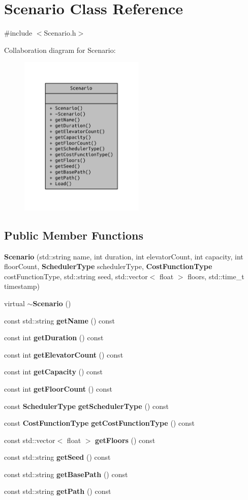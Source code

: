 \section{Scenario Class Reference}
\label{class_scenario}


{\ttfamily \#include $<$Scenario.\+h$>$}



Collaboration diagram for Scenario\+:
\nopagebreak
\begin{figure}[H]
\begin{center}
\leavevmode
\includegraphics[width=169pt]{class_scenario__coll__graph}
\end{center}
\end{figure}
\subsection*{Public Member Functions}
\begin{DoxyCompactItemize}
\item 
{\bf Scenario} (std\+::string name, int duration, int elevator\+Count, int capacity, int floor\+Count, {\bf Scheduler\+Type} scheduler\+Type, {\bf Cost\+Function\+Type} cost\+Function\+Type, std\+::string seed, std\+::vector$<$ float $>$ floors, std\+::time\+\_\+t timestamp)
\item 
virtual {\bf $\sim$\+Scenario} ()
\item 
const std\+::string {\bf get\+Name} () const 
\item 
const int {\bf get\+Duration} () const 
\item 
const int {\bf get\+Elevator\+Count} () const 
\item 
const int {\bf get\+Capacity} () const 
\item 
const int {\bf get\+Floor\+Count} () const 
\item 
const {\bf Scheduler\+Type} {\bf get\+Scheduler\+Type} () const 
\item 
const {\bf Cost\+Function\+Type} {\bf get\+Cost\+Function\+Type} () const 
\item 
const std\+::vector$<$ float $>$ {\bf get\+Floors} () const 
\item 
const std\+::string {\bf get\+Seed} () const 
\item 
const std\+::string {\bf get\+Base\+Path} () const 
\item 
const std\+::string {\bf get\+Path} () const 
\end{DoxyCompactItemize}
